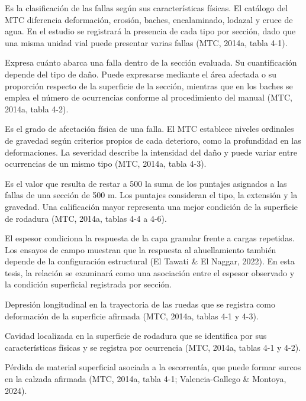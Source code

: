 \documentclass[12pt,a4paper]{article}
\begin{document}
Es la clasificación de las fallas según sus características físicas. El catálogo del MTC diferencia deformación, erosión, baches, encalaminado, lodazal y cruce de agua. En el estudio se registrará la presencia de cada tipo por sección, dado que una misma unidad vial puede presentar varias fallas (MTC, 2014a, tabla 4-1).

Expresa cuánto abarca una falla dentro de la sección evaluada. Su cuantificación depende del tipo de daño. Puede expresarse mediante el área afectada o su proporción respecto de la superficie de la sección, mientras que en los baches se emplea el número de ocurrencias conforme al procedimiento del manual (MTC, 2014a, tabla 4-2).

Es el grado de afectación física de una falla. El MTC establece niveles ordinales de gravedad según criterios propios de cada deterioro, como la profundidad en las deformaciones. La severidad describe la intensidad del daño y puede variar entre ocurrencias de un mismo tipo (MTC, 2014a, tabla 4-3).

Es el valor que resulta de restar a 500 la suma de los puntajes asignados a las fallas de una sección de 500 m. Los puntajes consideran el tipo, la extensión y la gravedad. Una calificación mayor representa una mejor condición de la superficie de rodadura (MTC, 2014a, tablas 4-4 a 4-6).

El espesor condiciona la respuesta de la capa granular frente a cargas repetidas. Los ensayos de campo muestran que la respuesta al ahuellamiento también depende de la configuración estructural (El Tawati \& El Naggar, 2022). En esta tesis, la relación se examinará como una asociación entre el espesor observado y la condición superficial registrada por sección.

Depresión longitudinal en la trayectoria de las ruedas que se registra como deformación de la superficie afirmada (MTC, 2014a, tablas 4-1 y 4-3).

Cavidad localizada en la superficie de rodadura que se identifica por sus características físicas y se registra por ocurrencia (MTC, 2014a, tablas 4-1 y 4-2).

Pérdida de material superficial asociada a la escorrentía, que puede formar surcos en la calzada afirmada (MTC, 2014a, tabla 4-1; Valencia-Gallego \& Montoya, 2024).
\end{document}
